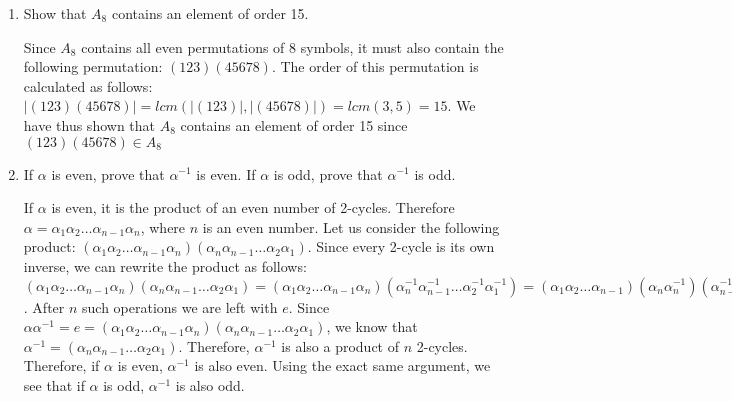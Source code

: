 \documentclass{article}
\begin{document}
\begin{enumerate}
\begin{enumerate}
    $\Rightarrow \lvert(1753)(264)\rvert = lcm(\lvert(1753)\rvert,\lvert(264)\rvert) = lcm(4,3) = 12$
\end{enumerate}
\item[9.] Show that $A_8$ contains an element of order 15.
\begin{flushleft}
Since $A_8$ contains all even permutations of 8 symbols, it must also contain the following permutation: $(123)(45678)$. The order of this permutation is calculated as follows: $\lvert(123)(45678)\rvert = lcm(\lvert(123)\rvert,\lvert(45678)\rvert) = lcm(3,5) = 15$. We have thus shown that $A_8$ contains an element of order 15 since $(123)(45678) \in A_8$
\end{flushleft}
\item[10.] If $\alpha$ is even, prove that $\alpha^{-1}$ is even. If $\alpha$ is odd, prove that $\alpha^{-1}$ is odd.
\begin{flushleft}
If $\alpha$ is even, it is the product of an even number of 2-cycles. Therefore $\alpha = \alpha_1\alpha_2\ldots\alpha_{n-1}\alpha_n$, where $n$ is an even number. Let us consider the following product: $(\alpha_1\alpha_2\ldots\alpha_{n-1}\alpha_n)(\alpha_n\alpha_{n-1}\ldots\alpha_2\alpha_1)$. Since every 2-cycle is its own inverse, we can rewrite the product as follows: $(\alpha_1\alpha_2\ldots\alpha_{n-1}\alpha_n)(\alpha_n\alpha_{n-1}\ldots\alpha_2\alpha_1) = (\alpha_1\alpha_2\ldots\alpha_{n-1}\alpha_n)(\alpha_n^{-1}\alpha_{n-1}^{-1}\ldots\alpha_2^{-1}\alpha_1^{-1}) = (\alpha_1\alpha_2\ldots\alpha_{n-1})(\alpha_n\alpha_n^{-1})(\alpha_{n-1}^{-1}\ldots\alpha_2^{-1}\alpha_1^{-1}) = (\alpha_1\alpha_2\ldots\alpha_{n-1})(e)(\alpha_{n-1}^{-1}\ldots\alpha_2^{-1}\alpha_1^{-1}) = (\alpha_1\alpha_2\ldots\alpha_{n-1})(\alpha_{n-1}^{-1}\ldots\alpha_2^{-1}\alpha_1^{-1})$. After $n$ such operations we are left with $e$. Since $\alpha\alpha^{-1} = e = (\alpha_1\alpha_2\ldots\alpha_{n-1}\alpha_n)(\alpha_n\alpha_{n-1}\ldots\alpha_2\alpha_1)$, we know that $\alpha^{-1} = (\alpha_n\alpha_{n-1}\ldots\alpha_2\alpha_1)$. Therefore, $\alpha^{-1}$ is also a product of $n$ 2-cycles. Therefore, if $\alpha$ is even, $\alpha^{-1}$ is also even. Using the exact same argument, we see that if $\alpha$ is odd, $\alpha^{-1}$ is also odd.
\end{flushleft}
\end{enumerate}

\end{document}
